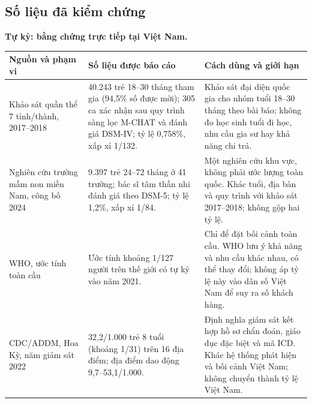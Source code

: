 \documentclass[11pt,a4paper]{article}
\begin{document}
\subsection{Số liệu đã kiểm chứng}

\par\medskip\noindent
\textbf{Tự kỷ: bằng chứng trực tiếp tại Việt Nam.}\par\smallskip\noindent
\begin{tabularx}{\textwidth}{p{3.15cm}p{5.25cm}Y}
\toprule
\textbf{Nguồn và phạm vi} & \textbf{Số liệu được báo cáo} &
\textbf{Cách dùng và giới hạn} \\
\midrule
Khảo sát quần thể 7 tỉnh/thành, 2017--2018 \cite{vui2022} &
40.243 trẻ 18--30 tháng tham gia (94,5\% số được mời); 305 ca xác nhận sau
quy trình sàng lọc M-CHAT và đánh giá DSM-IV; tỷ lệ 0,758\%, xấp xỉ 1/132. &
Khảo sát đại diện quốc gia cho nhóm tuổi 18--30 tháng theo bài báo; không đo
học sinh tuổi đi học, nhu cầu gia sư hay khả năng chi trả. \\
\addlinespace
Nghiên cứu trường mầm non miền Nam, công bố 2024 \cite{tran2024} &
9.397 trẻ 24--72 tháng ở 41 trường; bác sĩ tâm thần nhi đánh giá theo DSM-5;
tỷ lệ 1,2\%, xấp xỉ 1/84. &
Một nghiên cứu khu vực, không phải ước lượng toàn quốc. Khác tuổi, địa bàn và
quy trình với khảo sát 2017--2018; không gộp hai tỷ lệ. \\
\addlinespace
WHO, ước tính toàn cầu \cite{who2025} &
Ước tính khoảng 1/127 người trên thế giới có tự kỷ vào năm 2021. &
Chỉ để đặt bối cảnh toàn cầu. WHO lưu ý khả năng và nhu cầu khác nhau, có thể
thay đổi; không áp tỷ lệ này vào dân số Việt Nam để suy ra số khách hàng. \\
\addlinespace
CDC/ADDM, Hoa Kỳ, năm giám sát 2022 \cite{cdc2025} &
32,2/1.000 trẻ 8 tuổi (khoảng 1/31) trên 16 địa điểm; địa điểm dao động
9,7--53,1/1.000. &
Định nghĩa giám sát kết hợp hồ sơ chẩn đoán, giáo dục đặc biệt và mã ICD.
Khác hệ thống phát hiện và bối cảnh Việt Nam; không chuyển thành tỷ lệ Việt Nam. \\
\bottomrule
\end{tabularx}
\end{document}

